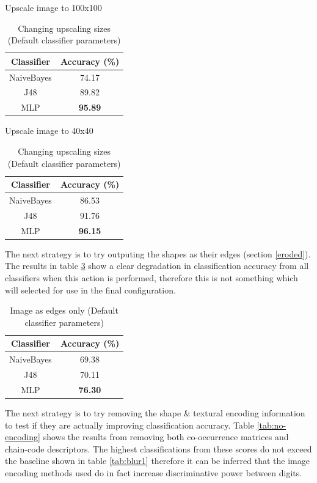\documentclass[12pt]{article}
\begin{document}
    \begin{table}[H]
      \begin{subtable}{.5\linewidth}
        \centering
        \caption{Upscale image to 100x100}
        \begin{tabular}{c|c}
          \toprule
          \multicolumn{1}{c|}{Classifier} & \multicolumn{1}{c}{Accuracy (\%)} \\
          \midrule
          NaiveBayes & 74.17 \\
          J48   & 89.82 \\
          MLP   & \textbf{95.89} \\
          \bottomrule
        \end{tabular}%
        \label{tab:upscale-100}%
      \end{subtable}
      \begin{subtable}{.5\linewidth}
        \centering
        \caption{Upscale image to 40x40}
        \begin{tabular}{c|c}
        \toprule
        Classifier & Accuracy (\%) \\
        \midrule
        NaiveBayes & 86.53 \\
        J48   & 91.76 \\
        MLP   & \textbf{96.15} \\
        \bottomrule
        \end{tabular}%
        \label{tab:upscale-40}%
      \end{subtable}
      \caption{Changing upscaling sizes (Default classifier parameters)}
      \label{tab:upscale}
    \end{table}
    The next strategy is to try outputing the shapes as their edges (section \ref{eroded}). The results in table \ref{tab:edges-only} show a clear degradation in classification accuracy from all classifiers when this action is performed, therefore this is not something which will selected for use in the final configuration.

    \begin{table}[H]
      \centering
      \begin{tabular}{c|c}
        \toprule
        Classifier & Accuracy (\%) \\
        \midrule
        NaiveBayes & 69.38 \\
        J48   & 70.11 \\
        MLP   & \textbf{76.30} \\
        \bottomrule
      \end{tabular}%
      \caption{Image as edges only (Default classifier parameters)}
      \label{tab:edges-only}%
    \end{table}%
    The next strategy is to try removing the shape \& textural encoding information to test if they are actually improving classification accuracy. Table \ref{tab:no-encoding} shows the results from removing both co-occurrence matrices and chain-code descriptors. The highest classifications from these scores do not exceed the baseline shown in table \ref{tab:blur1} therefore it can be inferred that the image encoding methods used do in fact increase discriminative power between digits.
\end{document}
